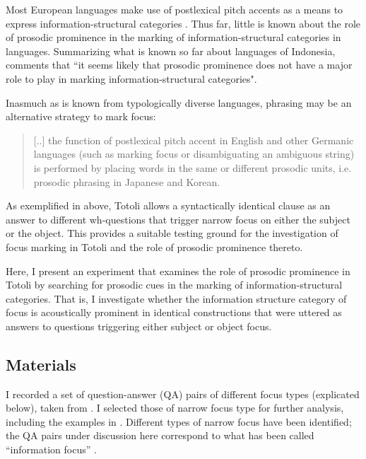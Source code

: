 Most European languages make use of postlexical pitch accents  as a means to express information-structural categories    \citep[see among others][]{Gussenhoven_1984, Ladd_2008, jun_2014, bolinger1986intonation, Halliday_1967, Grice_English, wagner_2012}. Thus far, little is known about the role of prosodic prominence in the marking of information-structural categories in   languages. Summarizing what is known so far about  languages of Indonesia, \citet[347]{Himmelmann_Preliminary_2018} comments that ``it seems likely that prosodic prominence does not have a major role to play in marking information-structural categories". 

Inasmuch as is known from typologically diverse languages, phrasing may be an alternative strategy to mark focus: 

\begin{quotation}
	[..] the function of postlexical pitch accent in English  and  other  Germanic  languages  (such  as  marking  focus  or  disambiguating an ambiguous string) is performed by placing words in the same or different prosodic units, i.e. prosodic phrasing in Japanese and Korean. \citep[414]{jun2006_typo} 
\end{quotation} 


As  exemplified in   above, Totoli allows a syntactically identical clause as an answer to different wh-questions that trigger narrow focus on either the subject or the object. This provides a suitable testing ground for the investigation of focus marking in Totoli and the role of prosodic prominence thereto.


Here, I present an experiment that  examines the role of prosodic prominence in Totoli by searching for prosodic cues in the marking of information-structural categories.  That is, I investigate whether the information structure category of focus  is acoustically prominent in identical constructions that were uttered as answers to questions triggering either subject or object focus. 

\subsection{Materials}
\label{sec:materials-focus}

I recorded a set of question-answer (QA) pairs of different focus types (explicated below), taken from  \citet[206--220]{Skopeteas.2006b}. I selected those of narrow focus type for further analysis, including the examples in  . Different types of narrow focus have been identified; the QA pairs under discussion here correspond to what has been called “information focus”  \citep{krifka2008basic}.  

